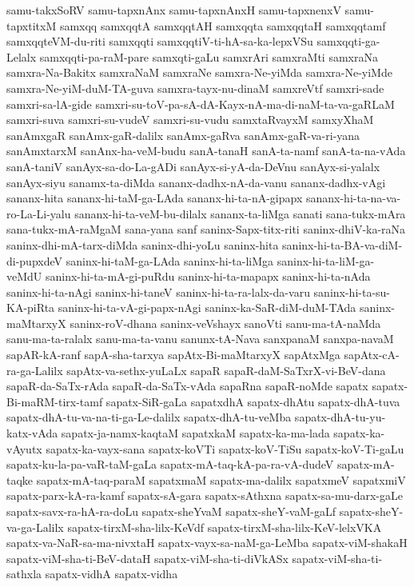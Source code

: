 {samu-takxSoRV
samu-tapxnAnx
samu-tapxnAnxH
samu-tapxnenxV
samu-tapxtitxM
samxqq
samxqqtA
samxqqtAH
samxqqta
samxqqtaH
samxqqtamf
samxqqteVM-du-riti
samxqqti
samxqqtiV-ti-hA-sa-ka-lepxVSu
samxqqti-ga-Lelalx
samxqqti-pa-raM-pare
samxqti-gaLu
samxrAri
samxraMti
samxraNa
samxra-Na-Bakitx
samxraNaM
samxraNe
samxra-Ne-yiMda
samxra-Ne-yiMde
samxra-Ne-yiM-duM-TA-guva
samxra-tayx-nu-dinaM
samxreVtf
samxri-sade
samxri-sa-lA-gide
samxri-su-toV-pa-sA-dA-Kayx-nA-ma-di-naM-ta-va-gaRLaM
samxri-suva
samxri-su-vudeV
samxri-su-vudu
samxtaRvayxM
samxyXhaM
sanAmxgaR
sanAmx-gaR-dalilx
sanAmx-gaRva
sanAmx-gaR-va-ri-yana
sanAmxtarxM
sanAnx-ha-veM-budu
sanA-tanaH
sanA-ta-namf
sanA-ta-na-vAda
sanA-taniV
sanAyx-sa-do-La-gADi
sanAyx-si-yA-da-DeVnu
sanAyx-si-yalalx
sanAyx-siyu
sanamx-ta-diMda
sananx-dadhx-nA-da-vanu
sananx-dadhx-vAgi
sananx-hita
sananx-hi-taM-ga-LAda
sananx-hi-ta-nA-gipapx
sananx-hi-ta-na-va-ro-La-Li-yalu
sananx-hi-ta-veM-bu-dilalx
sananx-ta-liMga
sanati
sana-tukx-mAra
sana-tukx-mA-raMgaM
sana-yana
sanf
saninx-Sapx-titx-riti
saninx-dhiV-ka-raNa
saninx-dhi-mA-tarx-diMda
saninx-dhi-yoLu
saninx-hita
saninx-hi-ta-BA-va-diM-di-pupxdeV
saninx-hi-taM-ga-LAda
saninx-hi-ta-liMga
saninx-hi-ta-liM-ga-veMdU
saninx-hi-ta-mA-gi-puRdu
saninx-hi-ta-mapapx
saninx-hi-ta-nAda
saninx-hi-ta-nAgi
saninx-hi-taneV
saninx-hi-ta-ra-lalx-da-varu
saninx-hi-ta-su-KA-piRta
saninx-hi-ta-vA-gi-papx-nAgi
saninx-ka-SaR-diM-duM-TAda
saninx-maMtarxyX
saninx-roV-dhana
saninx-veVshayx
sanoVti
sanu-ma-tA-naMda
sanu-ma-ta-ralalx
sanu-ma-ta-vanu
sanunx-tA-Nava
sanxpanaM
sanxpa-navaM
sapAR-kA-ranf
sapA-sha-tarxya
sapAtx-Bi-maMtarxyX
sapAtxMga
sapAtx-cA-ra-ga-Lalilx
sapAtx-va-sethx-yuLaLx
sapaR
sapaR-daM-SaTxrX-vi-BeV-dana
sapaR-da-SaTx-rAda
sapaR-da-SaTx-vAda
sapaRna
sapaR-noMde
sapatx
sapatx-Bi-maRM-tirx-tamf
sapatx-SiR-gaLa
sapatxdhA
sapatx-dhAtu
sapatx-dhA-tuva
sapatx-dhA-tu-va-na-ti-ga-Le-dalilx
sapatx-dhA-tu-veMba
sapatx-dhA-tu-yu-katx-vAda
sapatx-ja-namx-kaqtaM
sapatxkaM
sapatx-ka-ma-lada
sapatx-ka-vAyutx
sapatx-ka-vayx-sana
sapatx-koVTi
sapatx-koV-TiSu
sapatx-koV-Ti-gaLu
sapatx-ku-la-pa-vaR-taM-gaLa
sapatx-mA-taq-kA-pa-ra-vA-dudeV
sapatx-mA-taqke
sapatx-mA-taq-paraM
sapatxmaM
sapatx-ma-dalilx
sapatxmeV
sapatxmiV
sapatx-parx-kA-ra-kamf
sapatx-sA-gara
sapatx-sAthxna
sapatx-sa-mu-darx-gaLe
sapatx-savx-ra-hA-ra-doLu
sapatx-sheYvaM
sapatx-sheY-vaM-gaLf
sapatx-sheY-va-ga-Lalilx
sapatx-tirxM-sha-lilx-KeVdf
sapatx-tirxM-sha-lilx-KeV-lelxVKA
sapatx-va-NaR-sa-ma-nivxtaH
sapatx-vayx-sa-naM-ga-LeMba
sapatx-viM-shakaH
sapatx-viM-sha-ti-BeV-dataH
sapatx-viM-sha-ti-diVkASx
sapatx-viM-sha-ti-sathxla
sapatx-vidhA
sapatx-vidha
}
